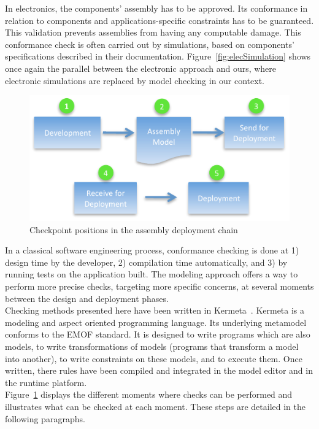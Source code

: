 In electronics, the components' assembly has to be approved. Its conformance in relation to components and applications-specific constraints has to be guaranteed. This validation prevents assemblies from having any computable damage. This conformance check is often carried out by simulations, based on components' specifications described in their documentation. Figure~\ref{fig:elecSimulation} shows once again the parallel between the electronic approach and ours, where electronic simulations are replaced by model checking in our context.\\

\begin{figure}[h!]
\centering
\includegraphics[width=.8\textwidth]{part2/pics/CheckPositions.pdf}
\caption{Checkpoint positions in the assembly deployment chain}
\label{fig:checkPoints}
\end{figure}



In a classical software engineering process, conformance checking is done at 1) design time by the developer, 2) compilation time automatically, and 3) by running tests on the application built. The modeling approach offers a way to perform more precise checks, targeting more specific concerns, at several moments between the design and deployment phases.\\
Checking methods presented here have been written in Kermeta~\cite{Muller05a}. Kermeta is a modeling and aspect oriented programming language. Its underlying metamodel conforms to the EMOF standard. It is designed to write programs which are also models, to write transformations of models (programs that transform a model into another), to write constraints on these models, and to execute them. Once written, there rules have been compiled and integrated in the model editor and in the runtime platform.\\
Figure~\ref{fig:checkPoints} displays the different moments where checks can be performed and illustrates what can be checked at each moment. These steps are detailed in the following paragraphs.

